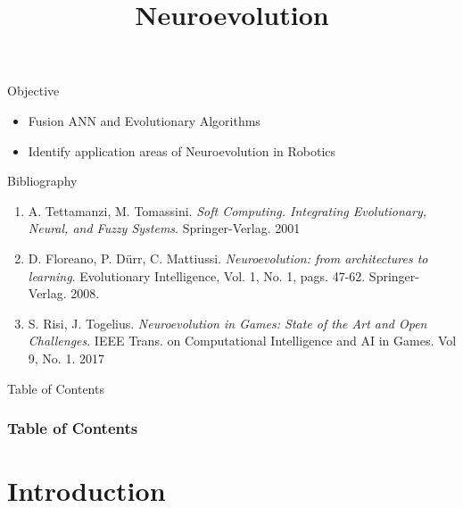 \documentclass[10pt,compress]{beamer} %
\title[Neuroevolution]{Neuroevolution}
\author{}
\institute{\asignatura}
\date{}
\begin{document}
{\titlepageBlue
    \begin{frame}
        \titlepage
    \end{frame}
}

\begin{frame}[plain]{}
   \begin{block}{Objective}
      \begin{itemize}
        \item Fusion ANN and Evolutionary Algorithms
        \item Identify application areas of Neuroevolution in Robotics
      \end{itemize}
   \end{block}

   \begin{block}{Bibliography}
      \begin{enumerate}
        \item A. Tettamanzi, M. Tomassini. \textit{Soft Computing. Integrating Evolutionary, Neural, and Fuzzy Systems}. Springer-Verlag. 2001
        \item D. Floreano, P. D\"urr, C. Mattiussi. \textit{Neuroevolution: from architectures to learning}. Evolutionary Intelligence, Vol. 1, No. 1, pags. 47-62. Springer-Verlag. 2008.
        \item S. Risi, J. Togelius. \textit{Neuroevolution in Games: State of the Art and Open Challenges}. IEEE Trans. on Computational Intelligence and AI in Games. Vol 9, No. 1. 2017
      \end{enumerate} 
   \end{block}
\end{frame}

{
\begin{frame}[shrink]{Table of Contents}
 \frametitle{Table of Contents}
 \tableofcontents
\end{frame}
}

\section{Introduction}
\end{document}
